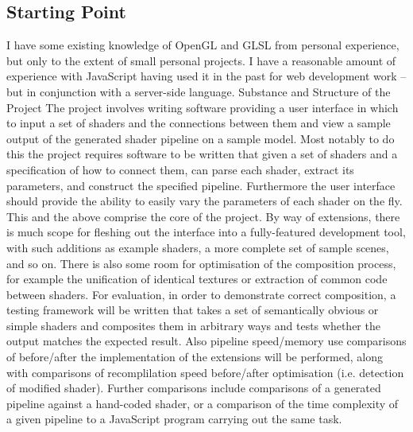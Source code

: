 \subsection*{Starting Point}
I have some existing knowledge of OpenGL and GLSL from personal experience, but only to the
extent of small personal projects. I have a reasonable amount of experience with JavaScript having
used it in the past for web development work – but in conjunction with a server-side language.
Substance and Structure of the Project
The project involves writing software providing a user interface in which to input a set of shaders
and the connections between them and view a sample output of the generated shader pipeline on a
sample model.
Most notably to do this the project requires software to be written that given a set of shaders and a
specification of how to connect them, can parse each shader, extract its parameters, and construct
the specified pipeline.
Furthermore the user interface should provide the ability to easily vary the parameters of each
shader on the fly. This and the above comprise the core of the project.
By way of extensions, there is much scope for fleshing out the interface into a fully-featured
development tool, with such additions as example shaders, a more complete set of sample scenes,
and so on. There is also some room for optimisation of the composition process, for example the
unification of identical textures or extraction of common code between shaders.
For evaluation, in order to demonstrate correct composition, a testing framework will be written that
takes a set of semantically obvious or simple shaders and composites them in arbitrary ways and
tests whether the output matches the expected result. Also pipeline speed/memory use comparisons
of before/after the implementation of the extensions will be performed, along with comparisons of
recomplilation speed before/after optimisation (i.e. detection of modified shader). Further
comparisons include comparisons of a generated pipeline against a hand-coded shader, or a
comparison of the time complexity of a given pipeline to a JavaScript program carrying out the
same task.


